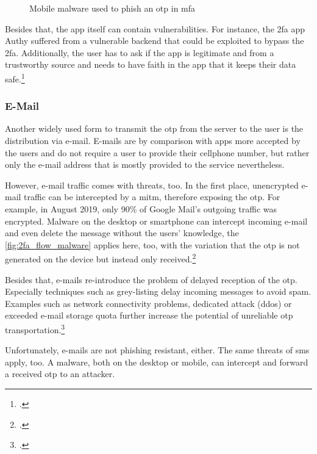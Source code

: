  \newpage
 
 \begin{figure}[hbt]
	\centering
	
	\caption[Mobile malware used to phish an \gls{otp} in \gls{mfa}]{Mobile malware used to phish an \gls{otp} in \gls{mfa}\footnotemark}
	\label{fig:2fa_flow_malware}
\end{figure}
 
 Besides that, the app itself can contain vulnerabilities. For instance, the \gls{2fa} app Authy suffered from a vulnerable backend that could be exploited to bypass the \gls{2fa}. Additionally, the user has to ask if the app is legitimate and from a trustworthy source and needs to have faith in the app that it keeps their data safe.\footcites[See][]{eset-bypass2fa}[See][]{sakurity-authy}
 
\subsubsection{E-Mail}

Another widely used form to transmit the \gls{otp} from the server to the user is the distribution via e-mail. E-mails are by comparison with apps more accepted by the users and do not require a user to provide their cellphone number, but rather only the e-mail address that is mostly provided to the service nevertheless.

However, e-mail traffic comes with threats, too. In the first place, unencrypted e-mail traffic can be intercepted by a \gls{mitm}, therefore exposing the \gls{otp}. For example, in August 2019, only 90\% of Google Mail's outgoing traffic was encrypted. Malware on the desktop or smartphone can intercept incoming e-mail and even delete the message without the users' knowledge, the \autoref{fig:2fa_flow_malware} applies here, too, with the variation that the \gls{otp} is not generated on the device but instead only received.\footcites[See][]{email-encryption}

Besides that, e-mails re-introduce the problem of delayed reception of the \gls{otp}. Especially techniques such as grey-listing delay incoming messages to avoid spam. Examples such as network connectivity problems, dedicated attack (\gls{ddos}) or exceeded e-mail storage quota further increase the potential of unreliable \gls{otp} transportation.\footcites[See][]{rfc6647}

Unfortunately, e-mails are not phishing resistant, either. The same threats of \gls{sms} apply, too. A malware, both on the desktop or mobile, can intercept and forward a received \gls{otp} to an attacker.
